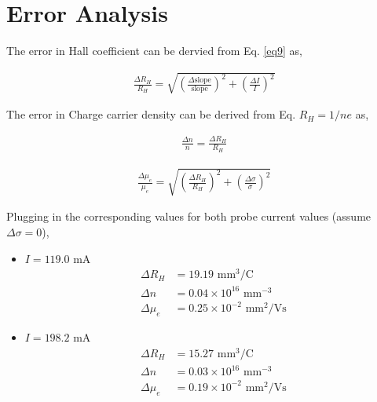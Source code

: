 \section{Error Analysis}

The error in Hall coefficient can be dervied from Eq. \ref{eq9} as, \vspace{-1em}

\begin{align}
    \frac{\Delta R_H}{R_H} = \sqrt{\left(\frac{\Delta\text{slope}}{\text{slope}}\right)^2 + \left(\frac{\Delta I}{I}\right)^2}
\end{align}

The error in Charge carrier density can be derived from Eq. $R_H=1/ne$ as, 

\begin{align}
    \frac{\Delta n}{n} = \frac{\Delta R_H}{R_H}
\end{align}

\begin{align}
    \frac{\Delta \mu_e}{\mu_e} = \sqrt{\left(\frac{\Delta R_H}{R_H}\right)^2 + \left(\frac{\Delta \sigma}{\sigma}\right)^2}
\end{align}

Plugging in the corresponding values for both probe current values (assume $\Delta \sigma=0$), 

\begin{itemize}
    \item $I=119.0$ mA
    \begin{align*}
        \Delta R_H &= 19.19 \text{ mm}^3/\text{C}\\
        \Delta n &= 0.04 \times 10^{16} \text{ mm}^{-3}\\
        \Delta \mu_e &= 0.25 \times 10^{-2} \text{ mm}^2/\text{Vs}
    \end{align*}
    \item $I=198.2$ mA
    \begin{align*}
        \Delta R_H &= 15.27 \text{ mm}^3/\text{C}\\
        \Delta n &= 0.03 \times 10^{16} \text{ mm}^{-3}\\
        \Delta \mu_e &= 0.19 \times 10^{-2} \text{ mm}^2/\text{Vs}
    \end{align*}
\end{itemize}





